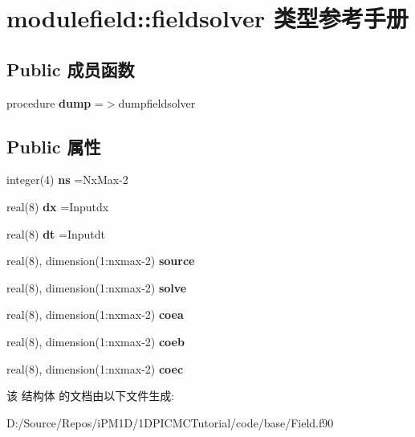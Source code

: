 \hypertarget{structmodulefield_1_1fieldsolver}{}\section{modulefield\+::fieldsolver 类型参考手册}
\label{structmodulefield_1_1fieldsolver}
\subsection*{Public 成员函数}
\begin{DoxyCompactItemize}
\item 
\mbox{\label{structmodulefield_1_1fieldsolver_a3c345d60991e0dc49e114e78a0fe3662}} 
procedure {\bfseries dump} =$>$dumpfieldsolver
\end{DoxyCompactItemize}
\subsection*{Public 属性}
\begin{DoxyCompactItemize}
\item 
\mbox{\label{structmodulefield_1_1fieldsolver_a476527add1d926dfd932c5fd707fee26}} 
integer(4) {\bfseries ns} =Nx\+Max-\/2
\item 
\mbox{\label{structmodulefield_1_1fieldsolver_ad2ffedd769e523c0799651efd2533d91}} 
real(8) {\bfseries dx} =Inputdx
\item 
\mbox{\label{structmodulefield_1_1fieldsolver_a86cb6ccaf14eab61e53ff56fb0e3b28a}} 
real(8) {\bfseries dt} =Inputdt
\item 
\mbox{\label{structmodulefield_1_1fieldsolver_acfead21dbc3229e3b3bc3323d4147d4e}} 
real(8), dimension(1\+:nxmax-\/2) {\bfseries source}
\item 
\mbox{\label{structmodulefield_1_1fieldsolver_a07b6321a2abcdf76c1e293e1758072c6}} 
real(8), dimension(1\+:nxmax-\/2) {\bfseries solve}
\item 
\mbox{\label{structmodulefield_1_1fieldsolver_a770e32b86ceea2144036236203fa2f42}} 
real(8), dimension(1\+:nxmax-\/2) {\bfseries coea}
\item 
\mbox{\label{structmodulefield_1_1fieldsolver_a3f08ad1fccb94d020a2083e430b0d307}} 
real(8), dimension(1\+:nxmax-\/2) {\bfseries coeb}
\item 
\mbox{\label{structmodulefield_1_1fieldsolver_ae6b563a76db2af51685e25d5d812827c}} 
real(8), dimension(1\+:nxmax-\/2) {\bfseries coec}
\end{DoxyCompactItemize}


该 结构体 的文档由以下文件生成\+:\begin{DoxyCompactItemize}
\item 
D\+:/\+Source/\+Repos/i\+P\+M1\+D/1\+D\+P\+I\+C\+M\+C\+Tutorial/code/base/Field.\+f90\end{DoxyCompactItemize}
